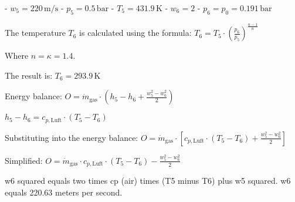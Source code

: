 - \( w_5 = 220 \, \text{m/s} \)  
- \( p_5 = 0.5 \, \text{bar} \)  
- \( T_5 = 431.9 \, \text{K} \)  
- \( w_6 = 2 \)  
- \( p_6 = p_0 = 0.191 \, \text{bar} \)  

The temperature \( T_6 \) is calculated using the formula:  
\( T_6 = T_5 \cdot \left( \frac{p_6}{p_5} \right)^{\frac{n-1}{n}} \)  

Where \( n = \kappa = 1.4 \).  

The result is:  
\( T_6 = 293.9 \, \text{K} \)  

Energy balance:  
\( O = \dot{m}_{\text{gas}} \cdot (h_5 - h_6 + \frac{w_5^2 - w_6^2}{2}) \)  

\( h_5 - h_6 = c_{p,\text{Luft}} \cdot (T_5 - T_6) \)  

Substituting into the energy balance:  
\( O = \dot{m}_{\text{gas}} \cdot \left[ c_{p,\text{Luft}} \cdot (T_5 - T_6) + \frac{w_5^2 - w_6^2}{2} \right] \)  

Simplified:  
\( O = \dot{m}_{\text{gas}} \cdot c_{p,\text{Luft}} \cdot (T_5 - T_6) - \frac{w_5^2 - w_6^2}{2} \)

w6 squared equals two times cp (air) times (T5 minus T6) plus w5 squared.  
w6 equals 220.63 meters per second.